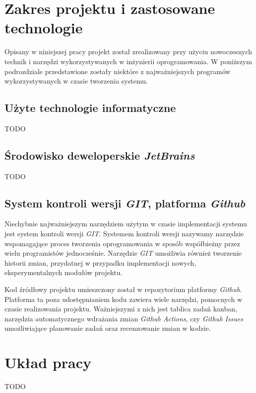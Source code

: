 \section{Zakres projektu i zastosowane technologie}

Opisany w niniejszej pracy projekt został zrealizowany przy użyciu nowoczesnych technik i narzędzi wykorzystywanych w inżynierii oprogramowania. W poniższym podrozdziale przedstawione zostały niektóre z najważniejszych programów wykorzystywanych w czasie tworzenia systemu.

\subsection{Użyte technologie informatyczne}

TODO

\subsection{Środowisko deweloperskie \textit{JetBrains}}

TODO

\subsection{System kontroli wersji \textit{GIT}, platforma \textit{Github}}

Niechybnie najważniejszym narzędziem użytym w czasie implementacji systemu jest system kontroli wersji \textit{GIT}. Systemem kontroli wersji nazywamy narzędzie wspomagające proces tworzenia oprogramowania w sposób współbieżny przez wielu programistów jednocześnie. Narzędzie \textit{GIT} umożliwia również tworzenie historii zmian, przydatnej w przypadku implementacji nowych, eksperymentalnych modułów projektu. 

Kod źródłowy projektu umieszczony został w repozytorium platformy \textit{Github}. Platforma ta poza udostępnianiem kodu zawiera wiele narzędzi, pomocnych w czasie realizowania projektu.  Ważniejszymi z nich jest tablica zadań kanban, narzędzia automatycznego wdrażania zmian \textit{Github Actions}, czy \textit{Github Issues} umożliwiające planowanie zadań oraz recenzowanie zmian w kodzie.

\section{Układ pracy}

TODO
